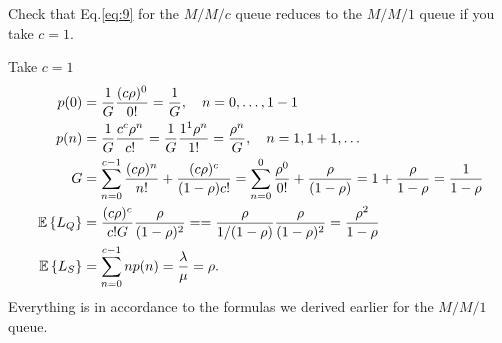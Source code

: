 \begin{question}
  Check that  Eq.\eqref{eq:9} for the $M/M/c$ queue reduces to the $M/M/1$ queue if you take $c=1$.
  \begin{solution}
Take $c=1$
 \begin{align}
p(0) &= \frac{1}G \frac{(c\rho)^0}{0!}=\frac1 G, \quad n=0,\ldots, 1-1 \\
p(n) &= \frac{1}G \frac{c^c\rho^n}{c!} = \frac{1}G \frac{1^1\rho^n}{1!} =\frac{\rho^n}G , \quad n=1,1+1, \ldots \\
G &=\sum_{n=0}^{c-1} \frac{(c\rho)^n}{n!} + \frac{(c\rho)^c}{(1-\rho)c!}
=\sum_{n=0}^{0} \frac{\rho^0}{0!} + \frac{\rho}{(1-\rho)} = 1 + \frac{\rho}{1-\rho} = \frac1{1-\rho}
\\
\,\mathbb{E}\left\{L_Q\right\} &= \frac{(c\rho)^c}{c! G}\frac{\rho}{(1-\rho)^2} = 
= \frac{\rho}{1/(1-\rho)}\frac{\rho}{(1-\rho)^2} = \frac{\rho^2}{1-\rho} \\
\,\mathbb{E}\left\{L_S\right\} &= \sum_{n=0}^{c-1}n p(n) = \frac{\lambda}\mu = \rho.
\end{align}
Everything is in accordance to the formulas we derived earlier for the $M/M/1$ queue.    
  \end{solution}
\end{question}

